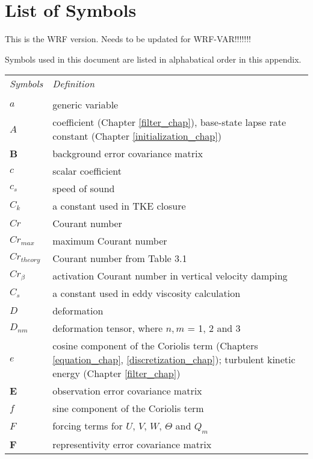 \chapter{List of Symbols}
\label{List of Symbols}

This is the WRF version. Needs to be updated for WRF-VAR!!!!!!!



Symbols used in this document are listed in alphabatical order in this appendix.
\\[2ex]

\begin{tabular}{ l p{5.5in} }

{\em Symbols}  & {\em Definition} \\   
\\
$a$            & generic variable \\ 
$A$            & coefficient (Chapter \ref{filter_chap}), base-state lapse rate constant (Chapter \ref{initialization_chap})  \\  
{\bf B}        & background error covariance matrix \\  
$c$            & scalar coefficient \\  
$c_s$          & speed of sound      \\  
$C_k$          & a constant used in TKE closure \\  
$Cr$           & Courant number      \\  
$Cr_{max}$     & maximum Courant number      \\  
$Cr_{theory}$  & Courant number from Table 3.1 \\  
$Cr_{\beta}$   & activation Courant number in vertical velocity damping \\  
$C_s$          & a constant used in eddy viscosity calculation \\  
$D$            & deformation \\
$D_{nm}$       & deformation tensor, where $n, m$ = 1, 2 and 3 \\  
$e$            & cosine component of the Coriolis term (Chapters \ref{equation_chap}, \ref{discretization_chap}); turbulent kinetic energy (Chapter \ref{filter_chap}) \\
{\bf E}        & observation error covariance matrix \\
$f$            & sine component of the Coriolis term \\
$F$            & forcing terms for $U$, $V$, $W$, $\Theta$ and $Q_m$  \\
{\bf F}        & representivity error covariance matrix \\

\end{tabular}
